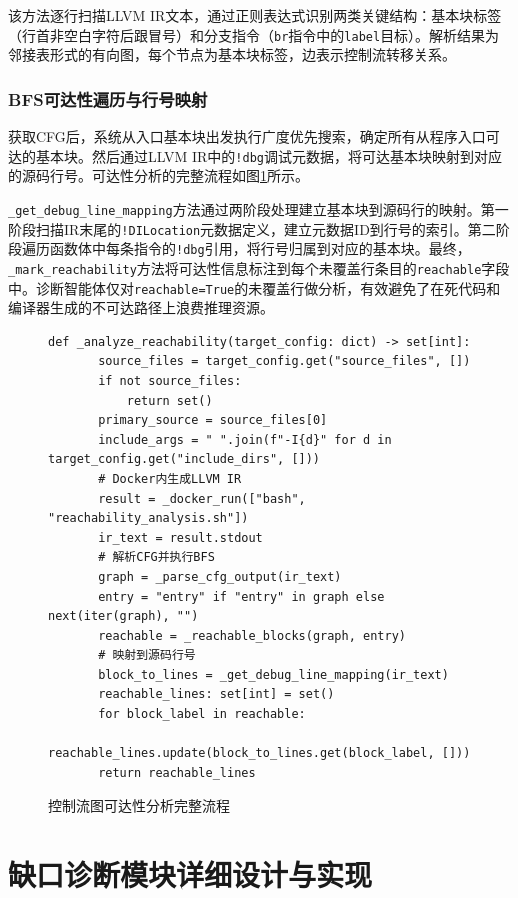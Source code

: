 该方法逐行扫描LLVM IR文本，通过正则表达式识别两类关键结构：基本块标签（行首非空白字符后跟冒号）和分支指令（\texttt{br}指令中的\texttt{label}目标）。解析结果为邻接表形式的有向图，每个节点为基本块标签，边表示控制流转移关系。

\subsubsection{BFS可达性遍历与行号映射}

获取CFG后，系统从入口基本块出发执行广度优先搜索，确定所有从程序入口可达的基本块。然后通过LLVM IR中的\texttt{!dbg}调试元数据，将可达基本块映射到对应的源码行号。可达性分析的完整流程如图\ref{fig:reachability}所示。

\texttt{\_get\_debug\_line\_mapping}方法通过两阶段处理建立基本块到源码行的映射。第一阶段扫描IR末尾的\texttt{!DILocation}元数据定义，建立元数据ID到行号的索引。第二阶段遍历函数体中每条指令的\texttt{!dbg}引用，将行号归属到对应的基本块。最终，\texttt{\_mark\_reachability}方法将可达性信息标注到每个未覆盖行条目的\texttt{reachable}字段中。诊断智能体仅对\texttt{reachable=True}的未覆盖行做分析，有效避免了在死代码和编译器生成的不可达路径上浪费推理资源。

\begin{figure}[H]
    \centering
    \begin{lstlisting}[style=style@python]
   def _analyze_reachability(target_config: dict) -> set[int]:
       source_files = target_config.get("source_files", [])
       if not source_files:
           return set()
       primary_source = source_files[0]
       include_args = " ".join(f"-I{d}" for d in target_config.get("include_dirs", []))
       # Docker内生成LLVM IR
       result = _docker_run(["bash", "reachability_analysis.sh"])
       ir_text = result.stdout
       # 解析CFG并执行BFS
       graph = _parse_cfg_output(ir_text)
       entry = "entry" if "entry" in graph else next(iter(graph), "")
       reachable = _reachable_blocks(graph, entry)
       # 映射到源码行号
       block_to_lines = _get_debug_line_mapping(ir_text)
       reachable_lines: set[int] = set()
       for block_label in reachable:
           reachable_lines.update(block_to_lines.get(block_label, []))
       return reachable_lines
    \end{lstlisting}
    \caption{控制流图可达性分析完整流程}
    \label{fig:reachability}
\end{figure}

\section{缺口诊断模块详细设计与实现}

